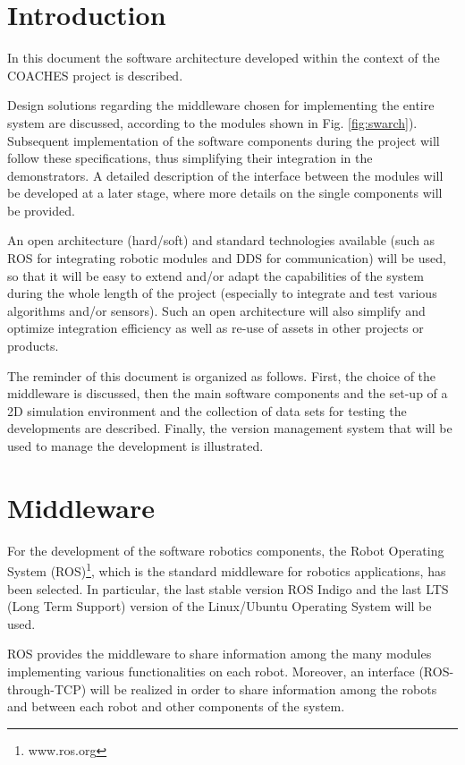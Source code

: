 \documentclass{article}
\begin{document}
\section{Introduction}

In this document the software architecture developed within the
context of the COACHES project is described.

Design solutions regarding the middleware chosen for implementing the entire system are discussed,
according to the modules shown in Fig. \ref{fig:swarch}).
Subsequent implementation of the software components during the project will follow  these  specifications,  thus  simplifying  their  integration  in  the demonstrators. 
A detailed description of the interface between the modules will be developed at a later stage, where more details on the single components will be provided.


An open architecture (hard/soft) and standard technologies available (such 
as ROS for integrating robotic modules and DDS for communication) will be used,
so that it will be 
easy to extend and/or adapt the capabilities of the system during the whole length of 
the  project  (especially  to  integrate  and  test  various  algorithms  and/or  sensors).  Such 
an open architecture will also simplify and optimize integration efficiency as well as re-use of assets in other projects or products. 

The reminder of this document is organized as follows.
First, the choice of the middleware is discussed, then the main software components and the
set-up of a 2D simulation environment and the collection of data sets for testing the developments are described.
Finally, the version management system that will be used to manage the development is illustrated.

\section{Middleware}

For the development of the software robotics components, the Robot Operating System (ROS)\footnote{www.ros.org}, which is the standard middleware for robotics applications, has been selected.
In particular, the last stable version ROS Indigo and the last LTS (Long Term Support) version of the Linux/Ubuntu Operating System will be used.

ROS provides the middleware to share information among the many modules implementing various functionalities on each robot. Moreover, an interface (ROS-through-TCP) will be realized in order to share information among the robots and between each robot and other components of the system.
\end{document}
